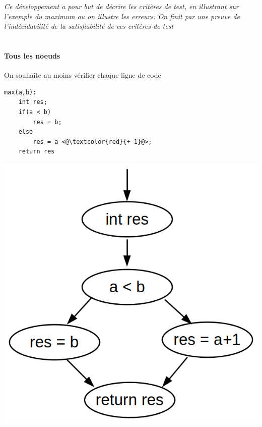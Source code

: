 

\textit{Ce développement a pour but de décrire les critères de test, en illustrant sur l'exemple du maximum ou on illustre les erreurs. On finit par une preuve de l'indécidabilité de la satisfiabilité de ces critères de test} \\ \\
\paragraph{Tous les noeuds} On souhaite au moins vérifier chaque ligne de code 
\\
\begin{minipage}{0.5\linewidth}
	\begin{lstlisting}
max(a,b):
    int res;
    if(a < b)
        res = b;
    else
        res = a <@\textcolor{red}{+ 1}@>;
    return res
	\end{lstlisting}
\end{minipage} 
\begin{minipage}{0.5\linewidth}
	\begin{center}
		\includegraphics[scale=0.2]{Developpements/critere de test/cas_11.png}
	\end{center}
\end{minipage}

